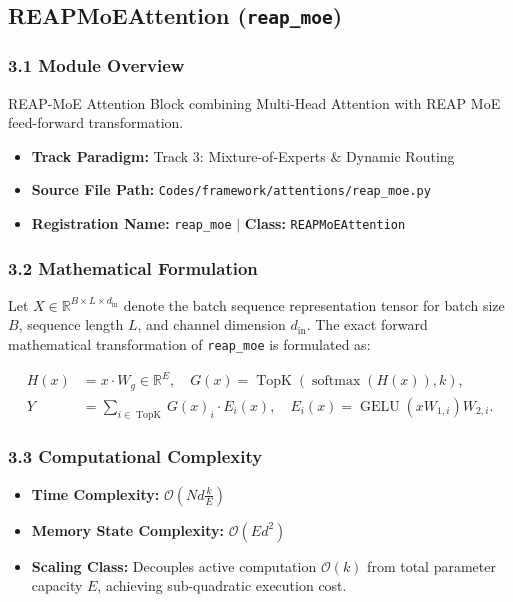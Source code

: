 \subsection{REAPMoEAttention (\texttt{reap\_moe})}
\label{sec:app_module_reap\_moe}

\subsubsection*{3.1 Module Overview}
REAP-MoE Attention Block combining Multi-Head Attention with REAP MoE feed-forward transformation.
\begin{itemize}
    \item \textbf{Track Paradigm:} Track 3: Mixture-of-Experts & Dynamic Routing
    \item \textbf{Source File Path:} \texttt{Codes/framework/attentions/reap\_moe.py}
    \item \textbf{Registration Name:} \texttt{reap\_moe} $\mid$ \textbf{Class:} \texttt{REAPMoEAttention}
\end{itemize}

\subsubsection*{3.2 Mathematical Formulation}
Let $X \in \mathbb{R}^{B \times L \times d_{\text{in}}}$ denote the batch sequence representation tensor for batch size $B$, sequence length $L$, and channel dimension $d_{\text{in}}$. The exact forward mathematical transformation of \texttt{reap\_moe} is formulated as:

\begin{align}
H(x) &= x \cdot W_g \in \mathbb{R}^{E}, \quad G(x) = \operatorname{TopK}\left(\operatorname{softmax}(H(x)), k\right), \\
Y &= \sum_{i \in \operatorname{TopK}} G(x)_i \cdot E_i(x), \quad E_i(x) = \operatorname{GELU}(x W_{1, i}) W_{2, i}.
\end{align}


\subsubsection*{3.3 Computational Complexity}
\begin{itemize}
    \item \textbf{Time Complexity:} $\mathcal{O}(N d \frac{k}{E})$
    \item \textbf{Memory State Complexity:} $\mathcal{O}(E d^2)$
    \item \textbf{Scaling Class:} Decouples active computation $\mathcal{O}(k)$ from total parameter capacity $E$, achieving sub-quadratic execution cost.
\end{itemize}

